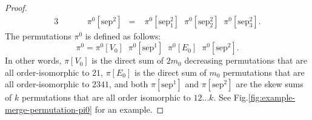 \begin{proof}
\begin{alignat*}{3}
    &&\quad&
    \pi^0[\text{sep}^{2}] &=&\; \pi^0[\text{sep}^{2}_{1}] \;\; \pi^0[\text{sep}^{2}_{2}] \;\; \pi^0[\text{sep}^{2}_{3}]\text{.}
  \end{alignat*}
  The permutations $\pi^0$ is defined as follows:
  $$
  \pi^0 = \pi^0[V_0] \;\; \pi^0[\text{sep}^{1}] \;\; \pi^0[E_0] \;\; \pi^0[\text{sep}^{2}]\text{.}
  $$
  In other words,
  $\pi[V_0]$ is the direct sum of $2m_0$ decreasing permutations
  that are all order-isomorphic to $21$,
  $\pi[E_0]$ is the direct sum of $m_0$ permutations that are all
  order-isomorphic to $2341$, and
  both $\pi[\text{sep}^{1}]$ and $\pi[\text{sep}^{2}]$ are the skew sums
  of $k$ permutations that are all order isomorphic to $12 \dots k$.
  See Fig.\ref{fig:example-merge-permutation-pi0} for an example.

  


\end{proof}
